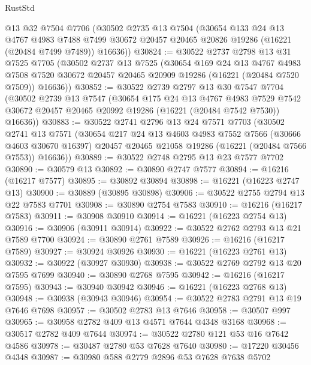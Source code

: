 \begin{lexlean}{RustStd}
\begin{coremodule}
    @13
    @32
    @7504
    @7706
    (@30502
      @2735
      @13
      @7504
      (@30654
        @133
        @24
        @13
        @4767
        @4983
        @7488
        @7499
        @30672
        @20457
        @20465
        @20826
        @19286
        (@16221 (@20484 @7499 @7489))
        @16636))
@30824 := @30522
    @2737
    @2798
    @13
    @31
    @7525
    @7705
    (@30502
      @2737
      @13
      @7525
      (@30654
        @169
        @24
        @13
        @4767
        @4983
        @7508
        @7520
        @30672
        @20457
        @20465
        @20909
        @19286
        (@16221 (@20484 @7520 @7509))
        @16636))
@30852 := @30522
    @2739
    @2797
    @13
    @30
    @7547
    @7704
    (@30502
      @2739
      @13
      @7547
      (@30654
        @175
        @24
        @13
        @4767
        @4983
        @7529
        @7542
        @30672
        @20457
        @20465
        @20992
        @19286
        (@16221 (@20484 @7542 @7530))
        @16636))
@30883 := @30522
    @2741
    @2796
    @13
    @24
    @7571
    @7703
    (@30502
      @2741
      @13
      @7571
      (@30654
        @217
        @24
        @13
        @4603
        @4983
        @7552
        @7566
        (@30666 @4603 @30670 @16397)
        @20457
        @20465
        @21058
        @19286
        (@16221 (@20484 @7566 @7553))
        @16636))
@30889 := @30522 @2748 @2795 @13 @23 @7577 @7702
@30890 := @30579 @13
@30892 := @30890 @2747 @7577
@30894 := @16216 (@16217 @7577)
@30895 := @30892 @30894
@30898 := @16221 (@16223 @2747 @13)
@30900 := @30889 (@30895 @30898)
@30906 := @30522 @2755 @2794 @13 @22 @7583 @7701
@30908 := @30890 @2754 @7583
@30910 := @16216 (@16217 @7583)
@30911 := @30908 @30910
@30914 := @16221 (@16223 @2754 @13)
@30916 := @30906 (@30911 @30914)
@30922 := @30522 @2762 @2793 @13 @21 @7589 @7700
@30924 := @30890 @2761 @7589
@30926 := @16216 (@16217 @7589)
@30927 := @30924 @30926
@30930 := @16221 (@16223 @2761 @13)
@30932 := @30922 (@30927 @30930)
@30938 := @30522 @2769 @2792 @13 @20 @7595 @7699
@30940 := @30890 @2768 @7595
@30942 := @16216 (@16217 @7595)
@30943 := @30940 @30942
@30946 := @16221 (@16223 @2768 @13)
@30948 := @30938 (@30943 @30946)
@30954 := @30522 @2783 @2791 @13 @19 @7646 @7698
@30957 := @30502 @2783 @13 @7646
@30958 := @30507 @997
@30965 := @30958 @2782 @409 @13 @4571 @7644 @4348 @3168
@30968 := @30517 @2782 @409 @7644
@30974 := @30522 @2780 @121 @53 @16 @7642 @4586
@30978 := @30487 @2780 @53 @7628 @7640
@30980 := @17220 @30456 @4348
@30987 := @30980 @588 @2779 @2896 @53 @7628 @7638 @5702

\end{coremodule}
\end{lexlean}
